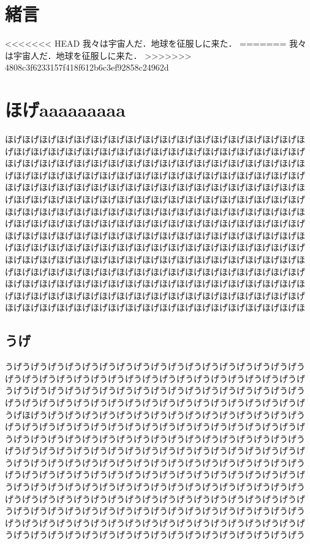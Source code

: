 \begin{small}

\section{緒言}
<<<<<<< HEAD
我々は宇宙人\cite{sentei1}だ．地球を征服しに来た．
=======
我々は宇宙人\cite{Hondo:hohoge2006}だ．地球を征服しに来た．
>>>>>>> 4808c3f6233157f418f612b6c3ef92858c24962d

\section{ほげaaaaaaaaa}
ほげほげほげほげほげほげほげほげほげほげほげほげほげほげほげほげほげほ
げほげほげほげほげほげほげほげほげほげほげほげほげほげほげほげほげほげ
ほげほげほげほげほげほげほげほげほげほげほげほげほげほげほげほげほげほ
げほげほげほげほげほげほげほげほげほげほげほげほげほげほげほげほげほげ
ほげほげほげほげほげほげほげほげほげほげほげほげほげほげほげほげほげほ
げほげほげほげほげほげほげほげほげほげほげほげほげほげほげほげほげほげ
ほげほげほげほげほげほげほげほげほげほげほげほげほげほげほげほげほげほ
げほげほげほげほげほげほげほげほげほげほげほげほげほげほげほげほげほげ
ほげほげほげほげほげほげほげほげほげほげほげほげほげほげほげほげほげほ
げほげほげほげほげほげほげほげほげほげほげほげほげほげほげほげほげほげ
ほげほげほげほげほげほげほげほげほげほげほげほげほげほげほげほげほげほ
げほげほげほげほげほげほげほげほげほげほげほげほげほげほげほげほげほげ
ほげほげほげほげほげほげほげほげほげほげほげほげほげほげほげほげほげほ
げほげほげほげほげほげほげほげほげほげほげほげほげほげほげほげほげほげ
ほげほげほげほげほげほげほげほげほげほげほげほげほげほげほげほげほげほ

\subsection{うげ}
うげうげうげうげうげうげうげうげうげうげうげうげうげうげうげうげうげう
げうげうげうげうげうげうげうげうげうげうげうげうげうげうげうげうげうげ
うげうげうげうげうげうげうげうげうげうげうげうげうげうげうげうげうげう
げうげうげうげうげうげうげうげうげうげうげうげうげうげうげうげうげうげ
うげほげうげうげうげうげうげうげうげうげうげうげうげうげうげうげうげう
げうげうげうげうげうげうげうげうげうげうげうげうげうげうげうげうげうげ
うげうげうげうげうげうげうげうげうげうげうげうげうげうげうげうげうげう
げうげうげうげうげうげうげうげうげうげうげうげうげうげうげうげうげうげ
うげうげうげうげうげうげうげうげうげうげうげうげうげうげうげうげうげう
げうげうげうげうげうげうげうげうげうげうげうげうげうげうげうげうげうげ
うげうげうげうげうげうげうげうげうげうげうげうげうげうげうげうげうげう
げうげうげうげうげうげうげうげうげうげうげうげうげうげうげうげうげうげ
うげうげうげうげうげうげうげうげうげうげうげうげうげうげうげうげうげう
げうげうげうげうげうげうげうげうげうげうげうげうげうげうげうげうげうげ
うげうげうげうげうげうげうげうげうげうげうげうげうげうげうげうげうげう


\end{small}
